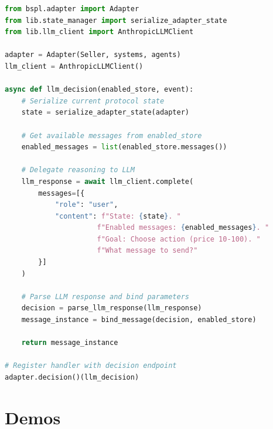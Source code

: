 \documentclass[runningheads]{llncs}
\newcommand{\ahoy}{Ahoy\xspace}
\begin{document}
\begin{lstlisting}[language=Python, caption=Ahoy Decision Endpoint Pattern,label=lst:ahoy-dec]
from bspl.adapter import Adapter
from lib.state_manager import serialize_adapter_state
from lib.llm_client import AnthropicLLMClient

adapter = Adapter(Seller, systems, agents)
llm_client = AnthropicLLMClient()

async def llm_decision(enabled_store, event):
    # Serialize current protocol state
    state = serialize_adapter_state(adapter)
    
    # Get available messages from enabled_store
    enabled_messages = list(enabled_store.messages())
    
    # Delegate reasoning to LLM
    llm_response = await llm_client.complete(
        messages=[{
            "role": "user",
            "content": f"State: {state}. "
                      f"Enabled messages: {enabled_messages}. "
                      f"Goal: Choose action (price 10-100). "
                      f"What message to send?"
        }]
    )
    
    # Parse LLM response and bind parameters
    decision = parse_llm_response(llm_response)
    message_instance = bind_message(decision, enabled_store)
    
    return message_instance

# Register handler with decision endpoint
adapter.decision()(llm_decision)
\end{lstlisting}

\section{Demos}

\end{document}
